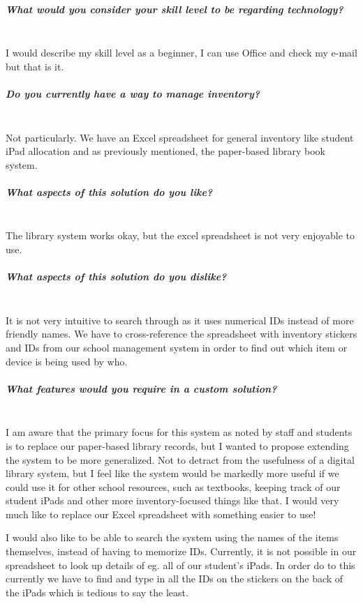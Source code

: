 \documentclass[../../../main.tex]{subfiles}
\begin{document}
\subparagraph{What would you consider your skill level to be regarding technology?}

\noindent \\ I would describe my skill level as a beginner, I can use Office and check my e-mail but that is it.

\subparagraph{Do you currently have a way to manage inventory?}

\noindent \\ Not particularly. We have an Excel spreadsheet for general inventory like student iPad allocation and as previously mentioned, the paper-based library book system.

\subparagraph{What aspects of this solution do you like?}

\noindent \\ The library system works okay, but the excel spreadsheet is not very enjoyable to use.

\subparagraph{What aspects of this solution do you dislike?}

\noindent \\ It is not very intuitive to search through as it uses numerical IDs instead of more friendly names. We have to cross-reference the spreadsheet with inventory stickers and IDs from our school management system in order to find out which item or device is being used by who.

\subparagraph{What features would you require in a custom solution?}

\noindent \\ I am aware that the primary focus for this system as noted by staff and students
is to replace our paper-based library records, but I wanted to propose extending the system to
be more generalized. Not to detract from the usefulness of a digital library system,
but I feel like the system would be markedly more useful if we could use it for other school
resources, such as textbooks, keeping track of our student iPads and other more
inventory-focused things like that. I would very much like to replace our Excel spreadsheet with something easier to use!

I would also like to be able to search the system using the names of the items themselves, instead of having to memorize IDs.
Currently, it is not possible in our spreadsheet to look up details of eg. all of our student's iPads.
In order do to this currently we have to find and type in all the IDs on the stickers on the back of the iPads which is tedious to say the least.
\end{document}
